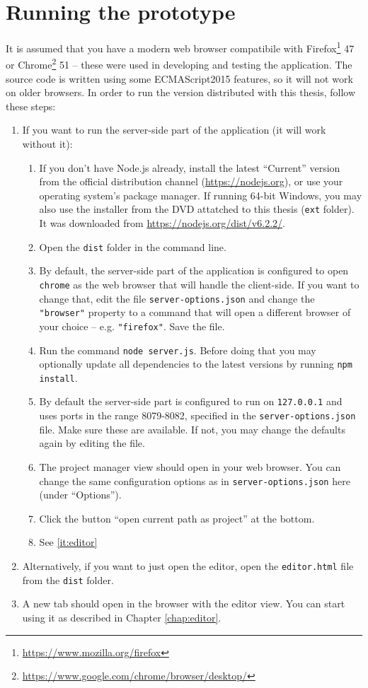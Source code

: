 \section{Running the prototype}
It is assumed that you have a modern web browser compatibile with Firefox\footnote{\url{
https://www.mozilla.org/firefox}} 47 or Chrome\footnote{\url{https://www.google.com/chrome/browser/desktop/}} 51 -- these were used in developing and testing the application. The source code is written using some ECMAScript2015 features, so it will not work on older browsers. In order to run the version distributed with this thesis, follow these steps:
\begin{enumerate}
    \item If you want to run the server-side part of the application (it will work without it):
    \begin{enumerate}
        \item If you don't have Node.js already, install the latest ``Current'' version from the official distribution channel (\url{https://nodejs.org}), or use your operating system's package manager. If running 64-bit Windows, you may also use the installer from the DVD attatched to this thesis (\texttt{ext} folder). It was downloaded from \url{https://nodejs.org/dist/v6.2.2/}.
        \item Open the \texttt{dist} folder in the command line.
        \item By default, the server-side part of the application is configured to open \texttt{chrome} as the web browser that will handle the client-side. If you want to change that, edit the file \texttt{server-options.json} and change the \texttt{"browser"} property to a command that will open a different browser of your choice -- e.g. \texttt{"firefox"}. Save the file.
        \item Run the command \texttt{node server.js}. Before doing that you may optionally update all dependencies to the latest versions by running \texttt{npm install}.
        \item By default the server-side part is configured to run on \texttt{127.0.0.1} and uses ports in the range 8079-8082, specified in the \texttt{server-options.json} file. Make sure these are available. If not, you may change the defaults again by editing the file.
        \item The project manager view should open in your web browser. You can change the same configuration options as in \texttt{server-options.json} here (under ``Options'').
        \item Click the button ``open current path as project'' at the bottom.
        \item See \ref{it:editor}
    \end{enumerate}
    \item Alternatively, if you want to just open the editor, open the \texttt{editor.html} file from the \texttt{dist} folder.
    \item\label{it:editor} A new tab should open in the browser with the editor view. You can start using it as described in Chapter \ref{chap:editor}.
\end{enumerate}

